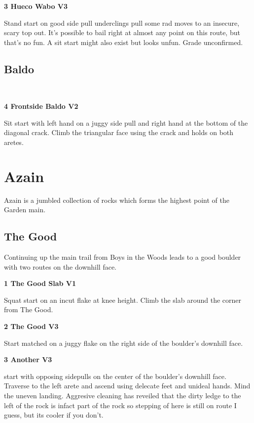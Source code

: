 \begin{multicols*}{2}

					\label{rt:Hueco Wabo} \colorbox{green!20}{\textbf{3 Hueco Wabo V3  }}
					\begin{adjustwidth}{1cm}{}
					Stand start on good side pull underclings pull some rad moves to an insecure, scary top out. It's possible to bail right at almost any point on this route, but that's no fun. A sit start might also exist but looks unfun. Grade unconfirmed.
					\end{adjustwidth}
			\subsection*{Baldo}\label{bf:Baldo}
			\
			

					\label{rt:Frontside Baldo} \colorbox{green!20}{\textbf{4 Frontside Baldo V2 \ding{72}   }}
					\begin{adjustwidth}{1cm}{}
					Sit start with left hand on a juggy side pull and right hand at the bottom of the diagonal crack. Climb the triangular face using the crack and holds on both aretes.
					\end{adjustwidth}
		\section{Azain}\label{sa:Azain}
	Azain is a jumbled collection of rocks which forms the highest point of the Garden main.
			\subsection*{The Good}\label{bf:The Good}
			Continuing up the main trail from Boys in the Woods leads to a good boulder with two routes on the downhill face.
			
					\label{rt:The Good Slab} \colorbox{green!20}{\textbf{1 The Good Slab V1    }}
					\begin{adjustwidth}{1cm}{}
					Squat start on an incut flake at knee height. Climb the slab around the corner from The Good.
					\end{adjustwidth}
								\fullPic{./maps/topos/good_c.png}{The Good}

					\label{rt:The Good} \colorbox{green!20}{\textbf{2 The Good V3    }}
					\begin{adjustwidth}{1cm}{}
					Start matched on a juggy flake on the right side of the boulder's downhill face.
					\end{adjustwidth}
					\label{rt:Another} \colorbox{green!20}{\textbf{3 Another V3   \warn }}
					\begin{adjustwidth}{1cm}{}
					start with opposing sidepulls on the center of the boulder's downhill face. Traverse to the left arete and ascend using delecate feet and unideal hands. Mind the uneven landing. Aggresive cleaning has reveiled that the dirty ledge to the left of the rock is infact part of the rock so stepping of here is still on route I guess, but its cooler if you don't.
					\end{adjustwidth}

\end{multicols*}

